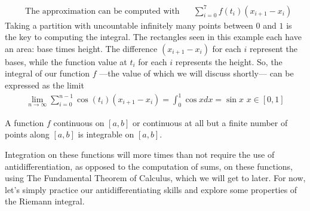 \begin{example}
{
}
\begin{align*}
    &\text{The approximation can be computed with} \hspace{20pt} \sum_{i=0}^{7} f(t_{i})(x_{i+1} - x_{i})
\end{align*}
Taking a partition with uncountable infinitely many points between $0$ and $1$ is the key to computing the integral. The rectangles seen in this example each have an area: base times height. The difference $(x_{i+1} - x_{i})$ for each $i$ represent the bases, while the function value at $t_{i}$ for each $i$ represents the height. So, the integral of our function $f$ ---the value of which we will discuss shortly--- can be expressed as the limit 
\begin{align*}
    \lim_{n \longrightarrow \infty} \sum_{i=0}^{n-1} \cos(t_{i}) (x_{i+1} - x_{i}) = \int_{0}^{1} \cos x dx = \sin x \hspace{4pt} x \in [0, 1]
\end{align*}
\label{integral_of_cosine}
\end{example}

\begin{theorem}
A function $f$ continuous on $[a, b]$ or continuous at all but a finite number of points along $[a, b]$ is integrable on $[a, b]$.
\end{theorem}

Integration on these functions will more times than not require the use of antidifferentiation, as opposed to the computation of sums, on these functions, using The Fundamental Theorem of Calculus, which we will get to later. For now, let's simply practice our antidifferentiating skills and explore some properties of the Riemann integral. 

